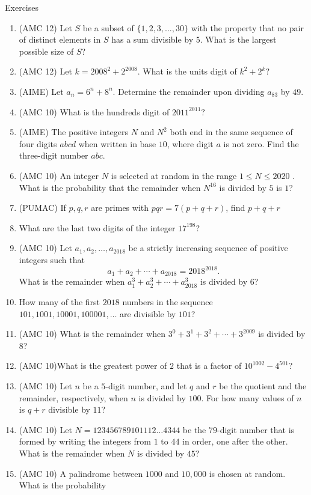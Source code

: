 \begin{xcb}{Exercises}
\begin{enumerate}
\item(AMC 12) Let $S$ be a subset of $\{1,2,3,\dots,30\}$ with the property that no pair of distinct elements in $S$ has a sum divisible by $5$. What is the largest possible size of $S$?
\item (AMC 12) Let $k={2008}^{2}+{2}^{2008}$. What is the units digit of $k^2+2^k$?
\item (AIME) Let $a_n=6^{n}+8^{n}$. Determine the remainder upon dividing $a_ {83}$ by $49$.
\item (AMC 10) What is the hundreds digit of $2011^{2011}?$
\item(AIME) The positive integers $N$ and $N^2$ both end in the same sequence of four digits $abcd$ when written in base $10$, where digit $a$ is not zero. Find the three-digit number $abc$.
\item (AMC 10) An integer $N$ is selected at random in the range $1\leq N \leq 2020$ . What is the probability that the remainder when $N^{16}$ is divided by $5$ is $1$?
\item (PUMAC) If $p, q, r$ are primes with $pqr = 7(p + q + r)$, find $p + q + r$
\item What are the last two digits of the integer $17^{198}$?
\item (AMC 10) Let $a_1,a_2,\dots,a_{2018}$ be a strictly increasing sequence of positive integers such that\[a_1+a_2+\cdots+a_{2018}=2018^{2018}.\]What is the remainder when $a_1^3+a_2^3+\cdots+a_{2018}^3$ is divided by $6$?
\item How many of the first $2018$ numbers in the sequence $101, 1001, 10001, 100001, \dots$ are divisible by $101$?
\item (AMC 10) What is the remainder when $3^0 + 3^1 + 3^2 + \cdots + 3^{2009}$ is divided by 8?
\item (AMC 10)What is the greatest power of $2$ that is a factor of $10^{1002} - 4^{501}$?
\item (AMC 10) Let $n$ be a $5$-digit number, and let $q$ and $r$ be the quotient and the remainder, respectively, when $n$ is divided by $100$. For how many values of $n$ is $q+r$ divisible by $11$?
\item (AMC 10) Let $N=123456789101112\dots4344$ be the $79$-digit number that is formed by writing the integers from $1$ to $44$ in order, one after the other. What is the remainder when $N$ is divided by $45$?
\item (AMC 10) A palindrome between $1000$ and $10, 000$ is chosen at random. What is the probability

\end{enumerate}
\end{xcb}
